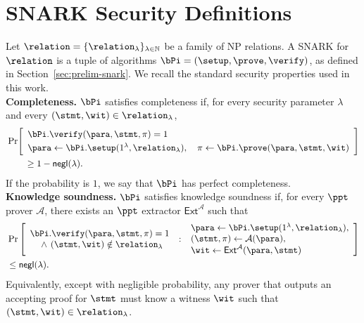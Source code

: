 \section{SNARK Security Definitions}
\label{app:snark-security}

Let \(\relation=\{\relation_\lambda\}_{\lambda\in\mathbb{N}}\) be a family of
NP relations.  A SNARK for \(\relation\) is a tuple of algorithms
\(\bPi=(\setup,\prove,\verify)\), as defined in
Section~\ref{sec:prelim-snark}.  We recall the standard security properties
used in this work. \\

\noindent\textbf{Completeness.}
\(\bPi\) satisfies completeness if, for every security parameter \(\lambda\)
and every \((\stmt,\wit)\in\relation_\lambda\),
\[
\begin{aligned}
&\Pr\!\left[
\begin{array}{l}
  \bPi.\verify(\para,\stmt,\pi)=1
  \\[1mm]
  \para\gets\bPi.\setup(1^\lambda,\relation_\lambda),
  \quad
  \pi\gets\bPi.\prove(\para,\stmt,\wit)
\end{array}
\right]
\\
&\hspace{2em}\ge 1-\textsf{negl}(\lambda).
\end{aligned}
\]
If the probability is \(1\), we say that \(\bPi\) has perfect completeness. \\

\noindent\textbf{Knowledge soundness.}
\(\bPi\) satisfies knowledge soundness if, for every \(\ppt\) prover
\(\mathcal{A}\), there exists an \(\ppt\) extractor
\(\mathsf{Ext}^{\mathcal{A}}\) such that
\[
\begin{aligned}
&\Pr\left[
\begin{array}{l}
  \bPi.\verify(\para,\stmt,\pi)=1 \\
  \quad {}\wedge{}\,(\stmt,\wit)\notin\relation_\lambda
\end{array}
\;:\;
\begin{array}{l}
  \para\gets\bPi.\setup(1^\lambda,\relation_\lambda),\\
  (\stmt,\pi)\gets\mathcal{A}(\para),\\
  \wit\gets\mathsf{Ext}^{\mathcal{A}}(\para,\stmt)
\end{array}
\right] \\
&\le \textsf{negl}(\lambda).
\end{aligned}
\]
Equivalently, except with negligible probability, any prover that outputs an
accepting proof for \(\stmt\) must know a witness \(\wit\) such that
\((\stmt,\wit)\in\relation_\lambda\). \\


